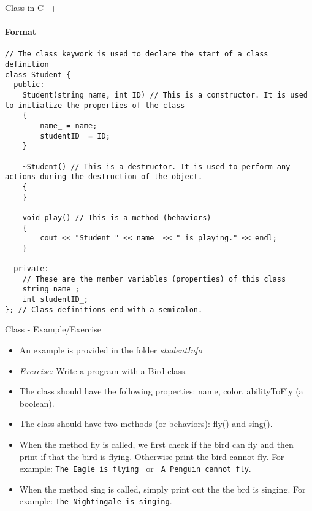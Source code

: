 \documentclass[aspectratio=169]{beamer}
\begin{document}
\begin{frame}[fragile]{Class in C++}
	\framesubtitle{Format}	
	\begin{lstlisting}
// The class keywork is used to declare the start of a class definition
class Student {
  public:
    Student(string name, int ID) // This is a constructor. It is used to initialize the properties of the class
    {
        name_ = name;
        studentID_ = ID;
    }
    
    ~Student() // This is a destructor. It is used to perform any actions during the destruction of the object.
    {
    }

    void play() // This is a method (behaviors)
    {
        cout << "Student " << name_ << " is playing." << endl;
    }

  private:
    // These are the member variables (properties) of this class
    string name_;
    int studentID_;
}; // Class definitions end with a semicolon.
	\end{lstlisting}
\end{frame}

\begin{frame}[fragile]{Class - Example/Exercise}
	\begin{itemize}
		\item An example is provided in the folder \textit{studentInfo}
		\item \textit{Exercise:} Write a program with a Bird class.
		\item The class should have the following properties: name, color, abilityToFly (a boolean).
		\item The class should have two methods (or behaviors): fly() and sing().
		\item When the method fly is called, we first check if the bird can fly and then print if that the bird is flying. Otherwise print the bird cannot fly. For example: \verb|The Eagle is flying | or \verb| A Penguin cannot fly|.
		\item When the method sing is called, simply print out the the brd is singing. For example: \verb|The Nightingale is singing|.
	\end{itemize}
\end{frame}
\end{document}

